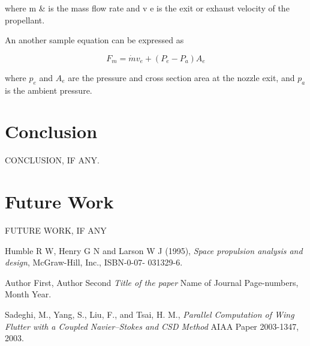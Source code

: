 \documentclass[12pt, a4paper]{article}
\begin{document}
where m & is the mass flow rate and v e is the exit or exhaust velocity of the
propellant. 

An another sample equation can be expressed as

\begin{equation} F_m= \dot{m}v_e + (P_e - P_a)A_e \end{equation}

where $p_e$ and $A_e$ are the pressure and cross section area at the nozzle exit, and $p_a$ is
the ambient pressure.


\newpage
\section{Conclusion}
CONCLUSION, IF ANY.

\newpage
\section{Future Work}
FUTURE WORK, IF ANY

\newpage
\begin{thebibliography}{9}
      
Humble R W, Henry G N and Larson W J (1995), \emph{Space propulsion analysis and design}, McGraw-Hill, Inc., ISBN-0-07-
031329-6.

Author First, Author Second \emph{Title of the paper} Name of Journal Page-numbers,
Month Year.

Sadeghi, M., Yang, S., Liu, F., and Tsai, H. M., \emph{Parallel Computation
of Wing Flutter with a Coupled Navier–Stokes and CSD Method}
AIAA Paper 2003-1347, 2003.

\end{thebibliography}
\end{document}
